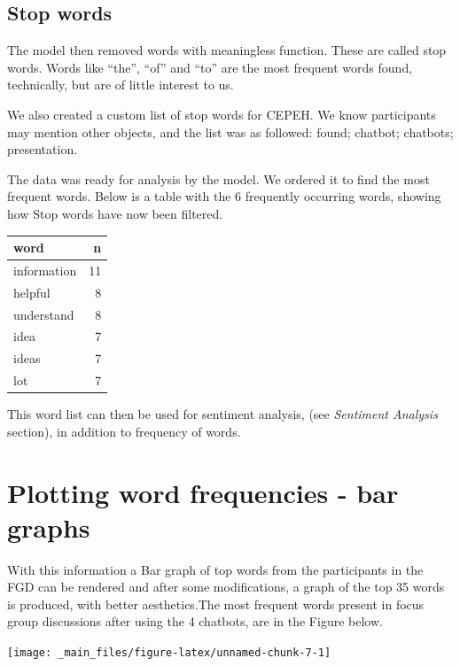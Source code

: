 \documentclass[a4paper, nobind]{templates/ociamthesis}
\begin{document}
\hypertarget{stop-words}{%
\subsection{Stop words}\label{stop-words}}

The model then removed words with meaningless function. These are called
stop words. Words like ``the'', ``of'' and ``to'' are the most frequent words
found, technically, but are of little interest to us.

We also created a custom list of stop words for CEPEH. We know
participants may mention other objects, and the list was as followed:
found; chatbot; chatbots; presentation.

The data was ready for analysis by the model. We ordered it to find the
most frequent words. Below is a table with the 6 frequently occurring
words, showing how Stop words have now been filtered.

\begin{longtable}[]{@{}lr@{}}
\toprule()
word & n \\
\midrule()
\endhead
information & 11 \\
helpful & 8 \\
understand & 8 \\
idea & 7 \\
ideas & 7 \\
lot & 7 \\
\bottomrule()
\end{longtable}

This word list can then be used for sentiment analysis, (see \emph{Sentiment
Analysis} section), in addition to frequency of words.

\hypertarget{plotting-word-frequencies---bar-graphs}{%
\section{Plotting word frequencies - bar graphs}\label{plotting-word-frequencies---bar-graphs}}

With this information a Bar graph of top words from the participants in
the FGD can be rendered and after some modifications, a graph of the top
35 words is produced, with better aesthetics.The most frequent words
present in focus group discussions after using the 4 chatbots, are in
the Figure below.

\begin{center}\texttt{[image: \_main\_files/figure-latex/unnamed-chunk-7-1]} \end{center}
\end{document}
